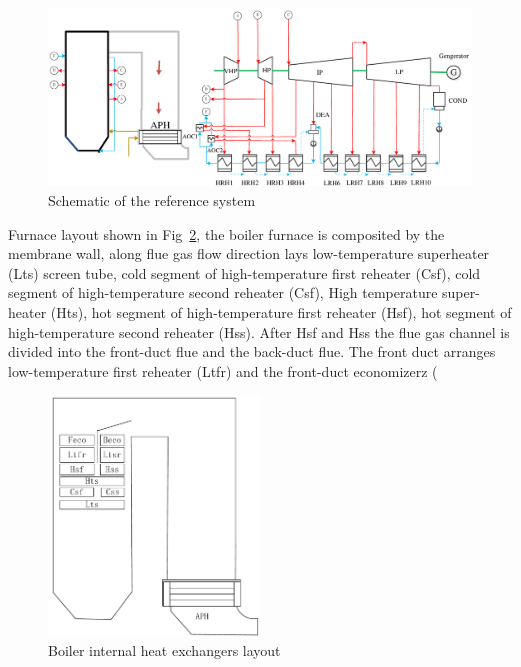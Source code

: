 \documentclass[preprint,12pt]{elsarticle}
\begin{document}
\begin{figure}[htbp]
\centering
\includegraphics[width=1\textwidth]{fig/reference_system}
\caption{Schematic of the reference system} 
\label{fig:reference_system}
\end{figure}
Furnace layout shown in Fig~\ref{fig:boiler_surface}, the boiler furnace is composited by the membrane wall, along flue gas flow direction lays low-temperature superheater (Lts) screen tube, cold segment of high-temperature ﬁrst reheater (Csf), cold segment of high-temperature second reheater (Csf), High temperature super-heater (Hts), hot segment of high-temperature ﬁrst reheater (Hsf), hot segment of high-temperature second reheater (Hss).
After Hsf and Hss the flue gas channel is divided into the front-duct flue and the back-duct flue. The front duct arranges low-temperature first reheater (Ltfr) and the front-duct economizerz 
(%
\begin{figure}[htbp]
\centering
\includegraphics[width=0.5\textwidth]{fig/boiler_surface}
\caption{Boiler internal heat exchangers layout} 
\label{fig:boiler_surface}
\end{figure}
\end{document}
